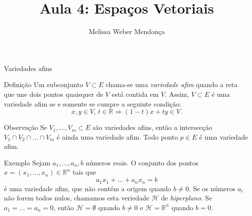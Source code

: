 \documentclass{beamer}
\title{Aula 4: Espaços Vetoriais}
\author{Melissa Weber Mendonça}
\begin{document}
\frame{\maketitle}

\begin{darkframes}

  
\begin{frame}{Variedades afins}
  \begin{block}{Definição}
    Um subconjunto $V\subset E$ chama-se uma \emph{variedade afim} quando a reta que une dois pontos quaisquer de $V$ está contida em $V$. Assim, $V\subset E$ é uma variedade afim se e somente se cumpre a seguinte condição:
   \begin{equation*}
     x,y \in V, \, t \in {\mathbb{R}} \Rightarrow (1-t)x + ty \in V.
   \end{equation*}
 \end{block}
 \vfill
\end{frame}

\begin{frame}{Observação}
  Se $V_1,\ldots, V_m \subset E$ são variedades afins, então a intersecção $V_1 \cap V_2\cap \ldots \cap V_m$ é ainda uma variedade afim. Todo ponto $p\in E$ é uma variedade afim.
\end{frame}

\begin{frame}{Exemplo}
  Sejam $a_1,\ldots, a_n, b$ números reais. O conjunto dos pontos $x=(x_1,\ldots,x_n)\in {\mathbb{R}}^n$ tais que 
   \begin{equation*}
     a_1x_1+\ldots+a_nx_n=b
   \end{equation*}
   é uma variedade afim, que não contém a origem quando $b \ne 0$. Se os números $a_i$ não forem todos nulos, chamamos esta veriedade ${\mathcal{H}}$ de \emph{hiperplano}. Se $a_1=\ldots=a_n=0$, então ${\mathcal{H}}=\emptyset$ quando $b\ne 0 $ e ${\mathcal{H}}={\mathbb{R}}^n$ quando $b=0$.
   \vfill
\end{frame}


\end{darkframes}
\end{document}
